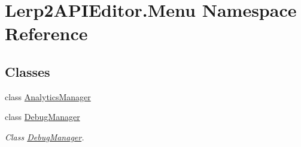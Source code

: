 \hypertarget{namespace_lerp2_a_p_i_editor_1_1_menu}{}\section{Lerp2\+A\+P\+I\+Editor.\+Menu Namespace Reference}
\label{namespace_lerp2_a_p_i_editor_1_1_menu}
\subsection*{Classes}
\begin{DoxyCompactItemize}
\item 
class \hyperlink{class_lerp2_a_p_i_editor_1_1_menu_1_1_analytics_manager}{Analytics\+Manager}
\item 
class \hyperlink{class_lerp2_a_p_i_editor_1_1_menu_1_1_debug_manager}{Debug\+Manager}
\begin{DoxyCompactList}\small\item\em Class \hyperlink{class_lerp2_a_p_i_editor_1_1_menu_1_1_debug_manager}{Debug\+Manager}. \end{DoxyCompactList}\end{DoxyCompactItemize}
